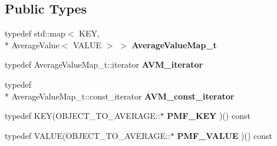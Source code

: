 \subsection*{Public Types}
\begin{DoxyCompactItemize}
\item 
typedef std\-::map$<$ K\-E\-Y, \\*
Average\-Value$<$ V\-A\-L\-U\-E $>$ $>$ {\bfseries Average\-Value\-Map\-\_\-t}\label{classCALICE_1_1ExtractConfigurationAverageProcessor_a9c98d937494a57cb0002414676ef0a0b}

\item 
typedef Average\-Value\-Map\-\_\-t\-::iterator {\bfseries A\-V\-M\-\_\-iterator}\label{classCALICE_1_1ExtractConfigurationAverageProcessor_af2676889c0cabe4ef45a8d0a41953f22}

\item 
typedef \\*
Average\-Value\-Map\-\_\-t\-::const\-\_\-iterator {\bfseries A\-V\-M\-\_\-const\-\_\-iterator}\label{classCALICE_1_1ExtractConfigurationAverageProcessor_ae898392ad5d30a3cf24636368c1f1817}

\item 
typedef K\-E\-Y(O\-B\-J\-E\-C\-T\-\_\-\-T\-O\-\_\-\-A\-V\-E\-R\-A\-G\-E\-::$\ast$ {\bfseries P\-M\-F\-\_\-\-K\-E\-Y} )() const \label{classCALICE_1_1ExtractConfigurationAverageProcessor_ac14ddbcd21b11b49846b2e9f6179806f}

\item 
typedef V\-A\-L\-U\-E(O\-B\-J\-E\-C\-T\-\_\-\-T\-O\-\_\-\-A\-V\-E\-R\-A\-G\-E\-::$\ast$ {\bfseries P\-M\-F\-\_\-\-V\-A\-L\-U\-E} )() const \label{classCALICE_1_1ExtractConfigurationAverageProcessor_a77c343fefe0aa8c92d90c2c841f2ba0f}

\end{DoxyCompactItemize}
